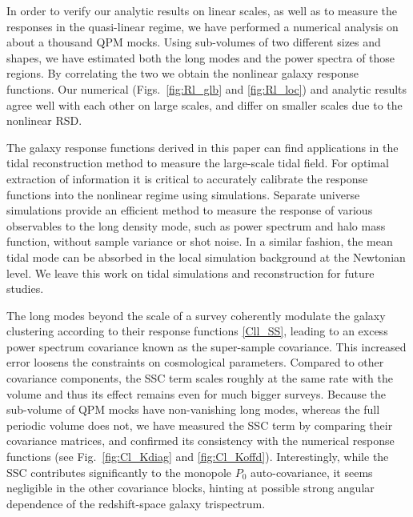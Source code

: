\documentclass[a4paper,11pt]{article}
\begin{document}
In order to verify our analytic results on linear scales, as well as to
measure the responses in the quasi-linear regime, we have performed a numerical
analysis on about a thousand QPM mocks.
Using sub-volumes of two different sizes and shapes, we have estimated both the
long modes and the power spectra of those regions.
By correlating the two we obtain the nonlinear galaxy response functions.
Our numerical (Figs.~\ref{fig:Rl_glb} and \ref{fig:Rl_loc}) and analytic
results agree well with each other on large scales, and differ on smaller
scales due to the nonlinear RSD.

The galaxy response functions derived in this paper can find applications in
the tidal reconstruction method \cite{PenShethEtAl12,ZhuPenEtAl16} to measure
the large-scale tidal field.
For optimal extraction of information it is critical to accurately calibrate
the response functions into the nonlinear regime using simulations.
Separate universe simulations \cite{LiHuEtAl14, McDonald03, Sirko05,
GnedinKravtsovEtAl11, BaldaufSeljakEtAl11a, WagnerSchmidtEtAl15, LiHuEtAl16,
LazeyrasWagnerEtAl16, BaldaufSeljakEtAl16, HuEtAl16, ChiangEtAl16,
ChiangEtAl17, CieplakSlosar16} provide an efficient method to measure the response of various
observables to the long density mode, such as power spectrum and halo mass
function, without sample variance or shot noise.
In a similar fashion, the mean tidal mode can be absorbed in the local
simulation background at the Newtonian level.
We leave this work on tidal simulations and reconstruction for future studies.

The long modes beyond the scale of a survey coherently modulate
the galaxy clustering according to their response functions \eqref{Cll_SS},
leading to an excess power spectrum covariance known as the super-sample
covariance.
This increased error loosens the constraints on cosmological parameters.
Compared to other covariance components, the SSC term scales
roughly at the same rate with the volume and thus its effect remains even for
much bigger surveys.
Because the sub-volume of QPM mocks have non-vanishing long modes, whereas the full
periodic volume does not, we have measured the SSC term by comparing their
covariance matrices, and confirmed its consistency with the numerical response
functions (see Fig.~\ref{fig:Cl_Kdiag} and \ref{fig:Cl_Koffd}).
Interestingly, while the SSC contributes significantly to the monopole $P_0$
auto-covariance, it seems negligible in the other covariance blocks, hinting at
possible strong angular dependence of the redshift-space galaxy trispectrum.
\end{document}
